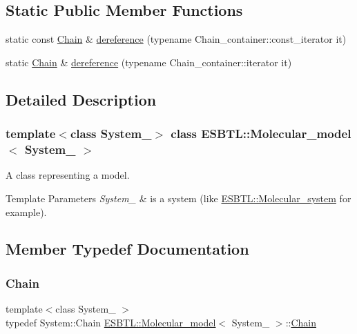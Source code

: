 \subsection*{Static Public Member Functions}
\begin{DoxyCompactItemize}
\item 
static const \hyperlink{classESBTL_1_1Molecular__model_a1d055eb841e64e198a1987e120fc985d}{Chain} \& \hyperlink{classESBTL_1_1Molecular__model_adf64056283aad0292e60c5aae7c27d6f}{dereference} (typename Chain\+\_\+container\+::const\+\_\+iterator it)
\item 
static \hyperlink{classESBTL_1_1Molecular__model_a1d055eb841e64e198a1987e120fc985d}{Chain} \& \hyperlink{classESBTL_1_1Molecular__model_a36477a79b12abc38a6ca592d2b65859a}{dereference} (typename Chain\+\_\+container\+::iterator it)
\end{DoxyCompactItemize}


\subsection{Detailed Description}
\subsubsection*{template$<$class System\+\_\+$>$\newline
class E\+S\+B\+T\+L\+::\+Molecular\+\_\+model$<$ System\+\_\+ $>$}

A class representing a model. 
\begin{DoxyTemplParams}{Template Parameters}
{\em System\+\_\+} & is a system (like \hyperlink{classESBTL_1_1Molecular__system}{E\+S\+B\+T\+L\+::\+Molecular\+\_\+system} for example). \\
\hline
\end{DoxyTemplParams}


\subsection{Member Typedef Documentation}
\mbox{\label{classESBTL_1_1Molecular__model_a1d055eb841e64e198a1987e120fc985d}} 
\subsubsection{\texorpdfstring{Chain}{Chain}}
{\footnotesize\ttfamily template$<$class System\+\_\+ $>$ \\
typedef System\+::\+Chain \hyperlink{classESBTL_1_1Molecular__model}{E\+S\+B\+T\+L\+::\+Molecular\+\_\+model}$<$ System\+\_\+ $>$\+::\hyperlink{classESBTL_1_1Molecular__model_a1d055eb841e64e198a1987e120fc985d}{Chain}}

